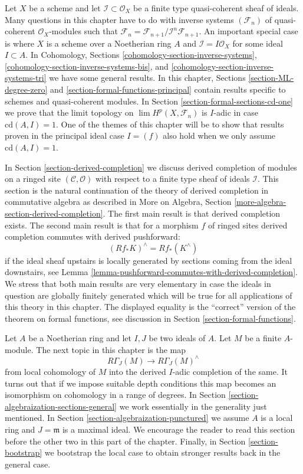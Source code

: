 \medskip\noindent
Let $X$ be a scheme and let $\mathcal{I} \subset \mathcal{O}_X$
be a finite type quasi-coherent sheaf of ideals. Many questions
in this chapter have to do with inverse systems $(\mathcal{F}_n)$
of quasi-coherent $\mathcal{O}_X$-modules such that
$\mathcal{F}_n = \mathcal{F}_{n + 1}/\mathcal{I}^n\mathcal{F}_{n + 1}$.
An important special case is where $X$ is a scheme over a Noetherian
ring $A$ and $\mathcal{I} = I \mathcal{O}_X$ for some ideal $I \subset A$.
In Cohomology, Sections \ref{cohomology-section-inverse-systems},
\ref{cohomology-section-inverse-systems-bis}, and
\ref{cohomology-section-inverse-systems-tri} we have some general
results. In this chapter, Sections \ref{section-ML-degree-zero} and
\ref{section-formal-functions-principal} contain results specific
to schemes and quasi-coherent modules. In
Section \ref{section-formal-sections-cd-one} we prove
that the limit topology on $\lim H^p(X, \mathcal{F}_n)$ is $I$-adic
in case $\text{cd}(A, I) = 1$. One of the themes
of this chapter will be to show that results proven in the
principal ideal case $I = (f)$
also hold when we only assume $\text{cd}(A, I) = 1$.

\medskip\noindent
In Section \ref{section-derived-completion} we discuss derived completion
of modules on a ringed site $(\mathcal{C}, \mathcal{O})$
with respect to a finite type sheaf of ideals $\mathcal{I}$.
This section is the natural continuation of the theory of derived completion
in commutative algebra as described in
More on Algebra, Section \ref{more-algebra-section-derived-completion}.
The first main result is that derived completion exists.
The second main result is that for a morphism $f$ of ringed sites
derived completion commutes with derived pushforward:
$$
(Rf_*K)^\wedge = Rf_*(K^\wedge)
$$
if the ideal sheaf upstairs is locally generated by sections coming
from the ideal downstairs, see
Lemma \ref{lemma-pushforward-commutes-with-derived-completion}.
We stress that both main results are very elementary in case the
ideals in question are globally finitely generated which will
be true for all applications of this theory in this chapter.
The displayed equality is the ``correct'' version of the
theorem on formal functions, see discussion in
Section \ref{section-formal-functions}.

\medskip\noindent
Let $A$ be a Noetherian ring and let $I, J$ be two ideals of $A$.
Let $M$ be a finite $A$-module.
The next topic in this chapter is the map
$$
R\Gamma_J(M) \longrightarrow R\Gamma_J(M)^\wedge
$$
from local cohomology of $M$ into the derived $I$-adic completion
of the same. It turns out that if we impose suitable depth conditions
this map becomes an isomorphism on cohomology in a range of degrees.
In Section \ref{section-algebraization-sections-general}
we work essentially in the generality just mentioned.
In Section \ref{section-algebraization-punctured}
we assume $A$ is a local ring and $J = \mathfrak m$ is a maximal ideal.
We encourage the reader to read this section before the other two in
this part of the chapter.
Finally, in Section \ref{section-bootstrap} we bootstrap
the local case to obtain stronger results back in the general case.

